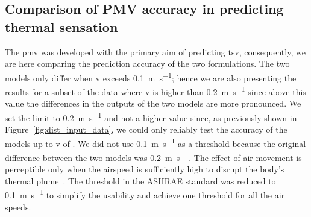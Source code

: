 \subsection{Comparison of PMV accuracy in predicting thermal sensation}\label{subsec:model-accuracy-comparison-in-predicting-thermal-sensation}
The \ac{pmv} was developed with the primary aim of predicting \ac{tsv}, consequently, we are here comparing the prediction accuracy of the two formulations.
The two models only differ when \ac{v} exceeds \qty{0.1}{\m\per\s};
hence we are also presenting the results for a subset of the data where \ac{v} is higher than \qty{0.2}{\m\per\s} since above this value the differences in the outputs of the two models are more pronounced.
We set the limit to \qty{0.2}{\m\per\s} and not a higher value since, as previously shown in Figure~\ref{fig:dist_input_data}, we could only reliably test the accuracy of the models up to \ac{v} of .
We did not use \qty{0.1}{\m\per\s} as a threshold because the original difference between the two models was \qty{0.2}{\m\per\s}.
The effect of air movement is perceptible only when the airspeed is sufficiently high to disrupt the body's thermal plume~\cite{zukowska_impact_2012}.
The threshold in the ASHRAE standard was reduced to \qty{0.1}{\m\per\s} to simplify the usability and achieve one threshold for all the air speeds.
